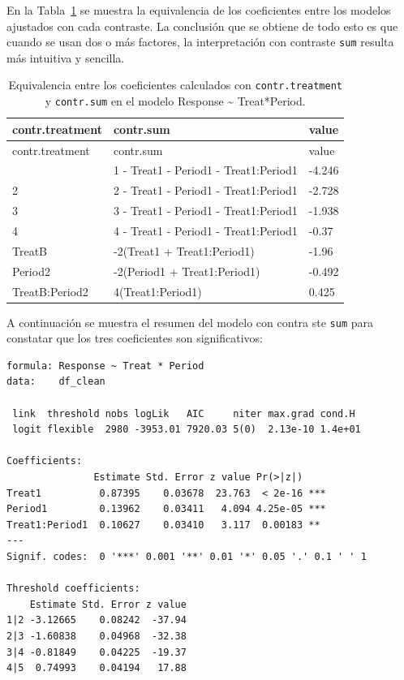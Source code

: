 \documentclass[
  12pt,
  a4paper,
  extrafontsizes,
  onecolumn,
  openright,
  table]{memoir}
\begin{document}
En la Tabla~\ref{tbl-contrat2} se muestra la equivalencia de los
coeficientes entre los modelos ajustados con cada contraste. La
conclusión que se obtiene de todo esto es que cuando se usan dos o más
factores, la interpretación con contraste \texttt{sum} resulta más
intuitiva y sencilla.

\small

\hypertarget{tbl-contrat2}{}
\begin{longtable}[]{@{}lll@{}}
\caption{\label{tbl-contrat2}Equivalencia entre los coeficientes
calculados con \texttt{contr.treatment} y \texttt{contr.sum} en el
modelo Response \textasciitilde{} Treat*Period.}\tabularnewline
\toprule\noalign{}
contr.treatment & contr.sum & value \\
\midrule\noalign{}
\endfirsthead
\toprule\noalign{}
contr.treatment & contr.sum & value \\
\midrule\noalign{}
\endhead
\bottomrule\noalign{}
\endlastfoot
1\textbar2 & 1\textbar2 - Treat1 - Period1 - Treat1:Period1 & -4.246 \\
2\textbar3 & 2\textbar3 - Treat1 - Period1 - Treat1:Period1 & -2.728 \\
3\textbar4 & 3\textbar4 - Treat1 - Period1 - Treat1:Period1 & -1.938 \\
4\textbar5 & 4\textbar5 - Treat1 - Period1 - Treat1:Period1 & -0.37 \\
TreatB & -2(Treat1 + Treat1:Period1) & -1.96 \\
Period2 & -2(Period1 + Treat1:Period1) & -0.492 \\
TreatB:Period2 & 4(Treat1:Period1) & 0.425 \\
\end{longtable}

\normalsize

A continuación se muestra el resumen del modelo con contra ste
\texttt{sum} para constatar que los tres coeficientes son
significativos:

\begin{verbatim}
formula: Response ~ Treat * Period
data:    df_clean

 link  threshold nobs logLik   AIC     niter max.grad cond.H 
 logit flexible  2980 -3953.01 7920.03 5(0)  2.13e-10 1.4e+01

Coefficients:
               Estimate Std. Error z value Pr(>|z|)    
Treat1          0.87395    0.03678  23.763  < 2e-16 ***
Period1         0.13962    0.03411   4.094 4.25e-05 ***
Treat1:Period1  0.10627    0.03410   3.117  0.00183 ** 
---
Signif. codes:  0 '***' 0.001 '**' 0.01 '*' 0.05 '.' 0.1 ' ' 1

Threshold coefficients:
    Estimate Std. Error z value
1|2 -3.12665    0.08242  -37.94
2|3 -1.60838    0.04968  -32.38
3|4 -0.81849    0.04225  -19.37
4|5  0.74993    0.04194   17.88
\end{verbatim}
\end{document}
